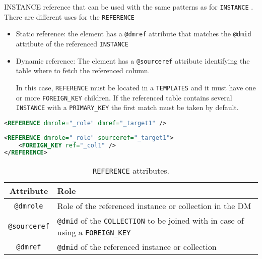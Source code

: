 INSTANCE reference that can be used with the same patterns as for \texttt{INSTANCE} .
There are different uses for the \texttt{REFERENCE} 

\begin{itemize}
    \item Static reference: the element has a \texttt{@dmref} attribute that matches the \texttt{@dmid} attribute of the referenced \texttt{INSTANCE} 
    \item Dynamic reference: The element has a \texttt{@sourceref} attribute identifying  the table where to fetch the referenced column. 
    
             In this case, \texttt{REFERENCE} must be located in a \texttt{TEMPLATES} and it must have one or more \texttt{FOREIGN\_KEY} children. 
             If the referenced table contains several \texttt{INSTANCE} with a \texttt{PRIMARY\_KEY}  the first match must be taken by default.
\end{itemize}

\begin{lstlisting}[caption={Simple \texttt{REFERENCE}, to be replaced with the \texttt{INSTANCE} having \texttt{@dmid} \_target1.},language=XML]
<REFERENCE dmrole="_role" dmref="_target1" />
\end{lstlisting}

\begin{lstlisting}[caption={Dynamic \texttt{REFERENCE}, to be replaced with the \texttt{INSTANCE} of the table of collection \_target1 and having a \texttt{PRIMARY\_KEY} matching the value of column  \_col1. This pattern is valid in the context of a TEMPLATES.},language=XML]
<REFERENCE dmrole="_role" sourceref="_target1">
    <FOREIGN_KEY ref="_col1" />
</REFERENCE>
\end{lstlisting}

\begin{table}[!htbp]
\small
\centering
\begin{tabulary}{\linewidth}{|c|J|}       
       \hline 
            \textbf{Attribute} & 
            \textbf {Role}\\
       \hline         \hline  
            \texttt{@dmrole} & 
            Role of the referenced instance or collection in the DM \\
        \hline 
            \texttt{@sourceref}  &
            \texttt{@dmid} of the \texttt{COLLECTION} to be joined with in case of using a \texttt{FOREIGN\_KEY} \\
        \hline 
            \texttt{@dmref} & 
            \texttt{@dmid} of the referenced instance or collection\\
        \hline 
     \end{tabulary}
     \caption{\texttt{REFERENCE} attributes.} 
     \label{tbl:reference-att}
 \end{table}

